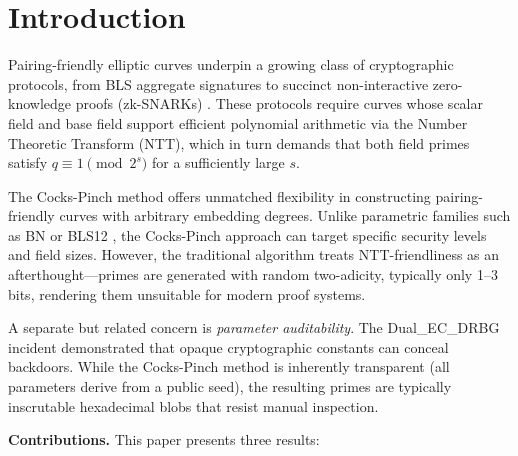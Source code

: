 \section{Introduction}

Pairing-friendly elliptic curves underpin a growing class of
cryptographic protocols, from BLS aggregate signatures \cite{BLS2001}
to succinct non-interactive zero-knowledge proofs (zk-SNARKs)
\cite{Groth2016, PLONK2019}. These protocols require curves whose
scalar field and base field support efficient polynomial arithmetic via
the Number Theoretic Transform (NTT), which in turn demands that both
field primes satisfy \(q \equiv 1 \pmod{2^s}\) for a sufficiently large
\(s\).

The Cocks-Pinch method \cite{CocksPinch2001} offers unmatched
flexibility in constructing pairing-friendly curves with arbitrary
embedding degrees. Unlike parametric families such as BN
\cite{FreemanScottTeske2010} or BLS12 \cite{BLS12_381}, the
Cocks-Pinch approach can target specific security levels and field
sizes. However, the traditional algorithm treats NTT-friendliness as an
afterthought---primes are generated with random two-adicity, typically
only 1--3 bits, rendering them unsuitable for modern proof systems.

A separate but related concern is \emph{parameter auditability}. The
Dual\_EC\_DRBG incident \cite{DualECDRBG} demonstrated that opaque
cryptographic constants can conceal backdoors. While the Cocks-Pinch
method is inherently transparent (all parameters derive from a public
seed), the resulting primes are typically inscrutable hexadecimal blobs
that resist manual inspection.

\textbf{Contributions.} This paper presents three results:

